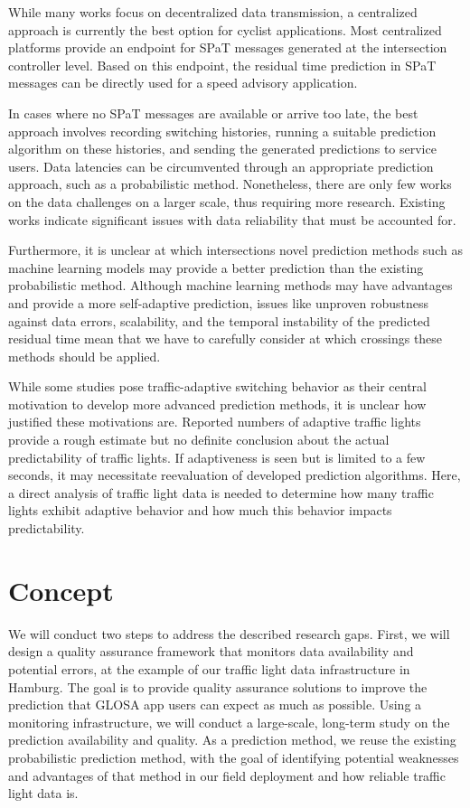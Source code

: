 \begin{Summary}
While many works focus on decentralized data transmission, a centralized approach is currently the best option for cyclist applications. Most centralized platforms provide an endpoint for SPaT messages generated at the intersection controller level. Based on this endpoint, the residual time prediction in SPaT messages can be directly used for a speed advisory application.

In cases where no SPaT messages are available or arrive too late, the best approach involves recording switching histories, running a suitable prediction algorithm on these histories, and sending the generated predictions to service users. Data latencies can be circumvented through an appropriate prediction approach, such as a probabilistic method. Nonetheless, there are only few works on the data challenges on a larger scale, thus requiring more research. Existing works indicate significant issues with data reliability that must be accounted for.

Furthermore, it is unclear at which intersections novel prediction methods such as machine learning models may provide a better prediction than the existing probabilistic method. Although machine learning methods may have advantages and provide a more self-adaptive prediction, issues like unproven robustness against data errors, scalability, and the temporal instability of the predicted residual time mean that we have to carefully consider at which crossings these methods should be applied. 

While some studies pose traffic-adaptive switching behavior as their central motivation to develop more advanced prediction methods, it is unclear how justified these motivations are. Reported numbers of adaptive traffic lights provide a rough estimate but no definite conclusion about the actual predictability of traffic lights. If adaptiveness is seen but is limited to a few seconds, it may necessitate reevaluation of developed prediction algorithms. Here, a direct analysis of traffic light data is needed to determine how many traffic lights exhibit adaptive behavior and how much this behavior impacts predictability.
\end{Summary}

\section{Concept}

We will conduct two steps to address the described research gaps. First, we will design a quality assurance framework that monitors data availability and potential errors, at the example of our traffic light data infrastructure in Hamburg. The goal is to provide quality assurance solutions to improve the prediction that GLOSA app users can expect as much as possible. Using a monitoring infrastructure, we will conduct a large-scale, long-term study on the prediction availability and quality. As a prediction method, we reuse the existing probabilistic prediction method, with the goal of identifying potential weaknesses and advantages of that method in our field deployment and how reliable traffic light data is.

